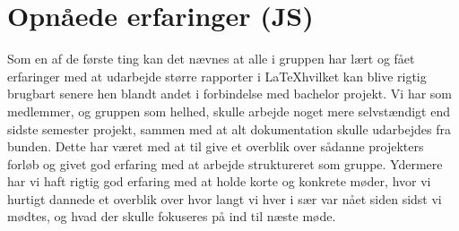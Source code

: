 \chapter{Opnåede erfaringer (JS)}

Som en af de første ting kan det nævnes at alle i gruppen har lært og fået erfaringer med at udarbejde større rapporter i \LaTeX  hvilket kan blive rigtig brugbart senere hen blandt andet i forbindelse med bachelor projekt.\newline
Vi har som medlemmer, og gruppen som helhed, skulle arbejde noget mere selvstændigt end sidste semester projekt, sammen med at alt dokumentation skulle udarbejdes fra bunden. Dette har været med at til give et overblik over sådanne projekters forløb og givet god erfaring med at arbejde struktureret som gruppe. Ydermere har vi haft rigtig god erfaring med at holde korte og konkrete møder, hvor vi hurtigt dannede et overblik over hvor langt vi hver i sær var nået siden sidst vi mødtes, og hvad der skulle fokuseres på ind til næste møde.

